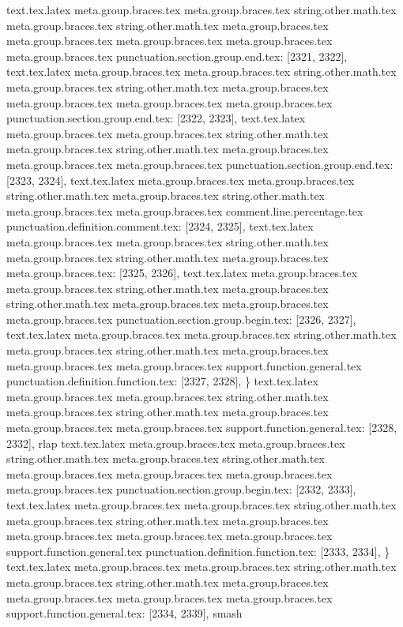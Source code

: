 {{{{{{{{{{{{{{{{{{{{{{{{{{{{{{{{{{{{{{{{{{{{{{{{{{{{{{{{{{{{{{{{{{{{{{{{{{{{{{{{{text.tex.latex meta.group.braces.tex meta.group.braces.tex string.other.math.tex meta.group.braces.tex string.other.math.tex meta.group.braces.tex meta.group.braces.tex meta.group.braces.tex meta.group.braces.tex meta.group.braces.tex punctuation.section.group.end.tex: [2321, 2322], {}}
text.tex.latex meta.group.braces.tex meta.group.braces.tex string.other.math.tex meta.group.braces.tex string.other.math.tex meta.group.braces.tex meta.group.braces.tex meta.group.braces.tex meta.group.braces.tex punctuation.section.group.end.tex: [2322, 2323], {}}
text.tex.latex meta.group.braces.tex meta.group.braces.tex string.other.math.tex meta.group.braces.tex string.other.math.tex meta.group.braces.tex meta.group.braces.tex meta.group.braces.tex punctuation.section.group.end.tex: [2323, 2324], {}}
text.tex.latex meta.group.braces.tex meta.group.braces.tex string.other.math.tex meta.group.braces.tex string.other.math.tex meta.group.braces.tex meta.group.braces.tex comment.line.percentage.tex punctuation.definition.comment.tex: [2324, 2325], {%
text.tex.latex meta.group.braces.tex meta.group.braces.tex string.other.math.tex meta.group.braces.tex string.other.math.tex meta.group.braces.tex meta.group.braces.tex: [2325, 2326], {
}
text.tex.latex meta.group.braces.tex meta.group.braces.tex string.other.math.tex meta.group.braces.tex string.other.math.tex meta.group.braces.tex meta.group.braces.tex meta.group.braces.tex punctuation.section.group.begin.tex: [2326, 2327], {{}
text.tex.latex meta.group.braces.tex meta.group.braces.tex string.other.math.tex meta.group.braces.tex string.other.math.tex meta.group.braces.tex meta.group.braces.tex meta.group.braces.tex support.function.general.tex punctuation.definition.function.tex: [2327, 2328], {\}
text.tex.latex meta.group.braces.tex meta.group.braces.tex string.other.math.tex meta.group.braces.tex string.other.math.tex meta.group.braces.tex meta.group.braces.tex meta.group.braces.tex support.function.general.tex: [2328, 2332], {rlap}
text.tex.latex meta.group.braces.tex meta.group.braces.tex string.other.math.tex meta.group.braces.tex string.other.math.tex meta.group.braces.tex meta.group.braces.tex meta.group.braces.tex meta.group.braces.tex punctuation.section.group.begin.tex: [2332, 2333], {{}
text.tex.latex meta.group.braces.tex meta.group.braces.tex string.other.math.tex meta.group.braces.tex string.other.math.tex meta.group.braces.tex meta.group.braces.tex meta.group.braces.tex meta.group.braces.tex support.function.general.tex punctuation.definition.function.tex: [2333, 2334], {\}
text.tex.latex meta.group.braces.tex meta.group.braces.tex string.other.math.tex meta.group.braces.tex string.other.math.tex meta.group.braces.tex meta.group.braces.tex meta.group.braces.tex meta.group.braces.tex support.function.general.tex: [2334, 2339], {smash}
}}}}}}}}}}}}}}}}}}}}}}}}}}}}}}}}}}}}}}}}}}}}}}}}}}}}}}}}}}}}}}}}}}}}}}}}}}}}}}}}}}}
